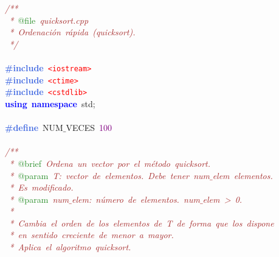 \noindent
\mbox{}\textit{\textcolor{Brown}{/**}} \\
\mbox{}\textit{\textcolor{Brown}{\ *\ }}\textcolor{ForestGreen}{@file}\textit{\textcolor{Brown}{\ quicksort.cpp}} \\
\mbox{}\textit{\textcolor{Brown}{\ *\ Ordenación\ rápida\ (quicksort).}} \\
\mbox{}\textit{\textcolor{Brown}{\ */}} \\
\mbox{} \\
\mbox{}\textbf{\textcolor{RoyalBlue}{\#include}}\ \texttt{\textcolor{Red}{\textless{}iostream\textgreater{}}} \\
\mbox{}\textbf{\textcolor{RoyalBlue}{\#include}}\ \texttt{\textcolor{Red}{\textless{}ctime\textgreater{}}} \\
\mbox{}\textbf{\textcolor{RoyalBlue}{\#include}}\ \texttt{\textcolor{Red}{\textless{}cstdlib\textgreater{}}} \\
\mbox{}\textbf{\textcolor{Blue}{using}}\ \textbf{\textcolor{Blue}{namespace}}\ std\textcolor{BrickRed}{;} \\
\mbox{} \\
\mbox{}\textbf{\textcolor{RoyalBlue}{\#define}}\ NUM$\_$VECES\ \textcolor{Purple}{100} \\
\mbox{} \\
\mbox{}\textit{\textcolor{Brown}{/**}} \\
\mbox{}\textit{\textcolor{Brown}{\ *\ }}\textcolor{ForestGreen}{@brief}\textit{\textcolor{Brown}{\ Ordena\ un\ vector\ por\ el\ método\ quicksort.}} \\
\mbox{}\textit{\textcolor{Brown}{\ *\ }}\textcolor{ForestGreen}{@param}\textit{\textcolor{Brown}{\ T:\ vector\ de\ elementos.\ Debe\ tener\ num$\_$elem\ elementos.}} \\
\mbox{}\textit{\textcolor{Brown}{\ *\ Es\ modificado.}} \\
\mbox{}\textit{\textcolor{Brown}{\ *\ }}\textcolor{ForestGreen}{@param}\textit{\textcolor{Brown}{\ num$\_$elem:\ número\ de\ elementos.\ num$\_$elem\ \textgreater{}\ 0.}} \\
\mbox{}\textit{\textcolor{Brown}{\ *\ }} \\
\mbox{}\textit{\textcolor{Brown}{\ *\ Cambia\ el\ orden\ de\ los\ elementos\ de\ T\ de\ forma\ que\ los\ dispone}} \\
\mbox{}\textit{\textcolor{Brown}{\ *\ en\ sentido\ creciente\ de\ menor\ a\ mayor.}} \\
\mbox{}\textit{\textcolor{Brown}{\ *\ Aplica\ el\ algoritmo\ quicksort.}} \\
